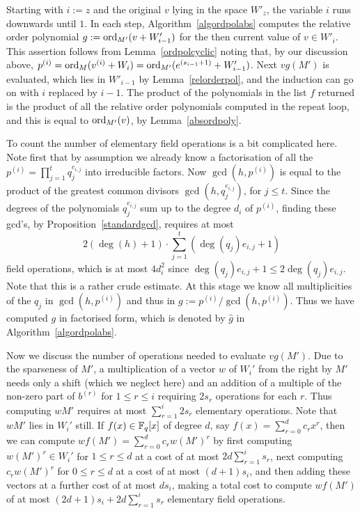 Starting with $i := z$ and the original $v$ lying in the space 
$W'_z$, the variable $i$ runs downwards until $1$.
In each step, Algorithm~\ref{algordpolabs}
computes the relative order polynomial $g := \mathrm{ord}_{M'}(v+W'_{i-1})$
for the then current value of $v \in W'_i$.
This assertion follows from
Lemma~\ref{ordpolcyclic} noting that,
by our discussion above, $p^{(i)} = \mathrm{ord}_M(v^{(i)}+W_i)= \mathrm{ord}_{M'}(e^{(s_{i-1}+1)}+W'_{i-1})$.
Next $v g(M')$ is evaluated, which lies in $W'_{i-1}$ by
Lemma~\ref{relorderpol}, and the induction can go on with $i$
replaced by $i-1$. The product of the polynomials in the list $f$ 
returned is the product of all 
the relative order polynomials computed in the repeat loop, and this is equal to
$\mathrm{ord}_{M'}(v)$, by Lemma~\ref{absordpoly}.

To count the number of elementary field operations is a bit complicated
here. Note first that by assumption we already know a factorisation of all the
$p^{(i)} = \prod_{j=1}^t q_j^{e_{i,j}}$ into
irreducible factors. Now  $\gcd(h,p^{(i)})$ is equal to the product of
the greatest common divisors $\gcd(h,q_j^{e_{i,j}})$, for $j\leq t$. Since the degrees of the
polynomials  $q_j^{e_{i,j}}$ sum up to the degree $d_i$ of $p^{(i)}$, finding these gcd's, by 
Proposition~\ref{standardgcd}, requires at most
\[ 
2(\deg(h)+1) \cdot \sum_{j=1}^t \left(\deg(q_j) e_{i,j} + 1\right) 
\] 
field operations, which is at most $4d_i^2$ since
$\deg(q_j) e_{i,j} + 1 \le 2 \deg(q_j) e_{i,j}$. Note that this is a rather
crude estimate. At this stage we know all multiplicities of the
$q_j$ in $\gcd(h,p^{(i)})$ and thus in $g := p^{(i)}/\gcd(h,p^{(i)})$.
Thus we have computed $g$ in factorised form, which is denoted by
$\hat g$ in Algorithm~\ref{algordpolabs}.

Now we discuss the number of operations needed to evaluate $v g(M')$.
Due to the sparseness of $M'$, a multiplication of a vector $w$ of
$W_i'$ from the right by $M'$ needs only a shift (which we neglect here)
and an addition of a multiple of the non-zero
part of $b^{(r)}$ for $1 \le r \le i$ requiring $2s_r$ operations for
each $r$. Thus computing $wM'$ requires at most $\sum_{r=1}^i 2s_r $
elementary operations. Note that $wM'$ lies in $W_i'$ still. If
$f(x)\in\mathbb{F}_q[x]$ of degree $d$, say $f(x)=\sum_{r=0}^dc_rx^r$, then we
can compute $wf(M')=\sum_{r=0}^dc_rw(M')^r$ by first computing
$w(M')^r\in W_i'$ for $1\leq r\leq d$ at a cost of at most
$2d\sum_{r=1}^i s_r $, next computing $c_rw(M')^r$ for $0\leq r\leq d$
at a cost of at most $(d+1)s_i$, and then adding these vectors at a
further cost of at most
$ds_i$, making a total cost to compute $wf(M')$ of at most
$(2d+1)s_i +2d\sum_{r=1}^i s_r $ elementary field operations.

